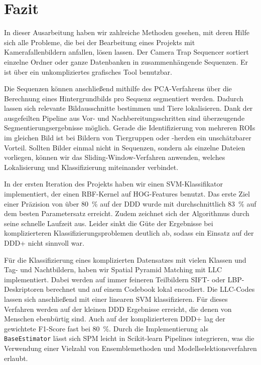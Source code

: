 \section{Fazit}
\label{sec:fazit}

In dieser Ausarbeitung haben wir zahlreiche Methoden gesehen, mit deren Hilfe sich alle Probleme, die bei der Bearbeitung eines Projekts mit Kamerafallenbildern anfallen, lösen lassen. Der Camera Trap Sequencer sortiert einzelne Ordner oder ganze Datenbanken in zusammenhängende Sequenzen. Er ist über ein unkompliziertes grafisches Tool benutzbar.

Die Sequenzen können anschließend mithilfe des PCA-Verfahrens über die Berechnung eines Hintergrundbilds pro Sequenz segmentiert werden. Dadurch lassen sich relevante Bildausschnitte bestimmen und Tiere lokalisieren. Dank der ausgefeilten Pipeline aus Vor- und Nachbereitungsschritten sind überzeugende Segmentierungsergebnisse möglich. Gerade die Identifizierung von mehreren ROIs im gleichen Bild ist bei Bildern von Tiergruppen oder -herden ein unschätzbarer Vorteil. Sollten Bilder einmal nicht in Sequenzen, sondern als einzelne Dateien vorliegen, können wir das Sliding-Window-Verfahren anwenden, welches Lokalisierung und Klassifizierung miteinander verbindet.

In der ersten Iteration des Projekts haben wir einen SVM-Klassifikator implementiert, der einen RBF-Kernel auf HOG-Features benutzt. Das erste Ziel einer Präzision von über 80~\% auf der DDD wurde mit durchschnittlich 83~\% auf dem besten Parametersatz erreicht. Zudem zeichnet sich der Algorithmus durch seine schnelle Laufzeit aus. Leider sinkt die Güte der Ergebnisse bei komplizierteren Klassifizierungsproblemen deutlich ab, sodass ein Einsatz auf der DDD+ nicht sinnvoll war.

Für die Klassifizierung eines komplizierten Datensatzes mit vielen Klassen und Tag- und Nachtbildern, haben wir Spatial Pyramid Matching mit LLC implementiert. Dabei werden auf immer feineren Teilbildern SIFT- oder LBP-Deskriptoren berechnet und auf einem Codebook lokal encodiert. Die LLC-Codes lassen sich anschließend mit einer linearen SVM klassifizieren. Für dieses Verfahren werden auf der kleinen DDD Ergebnisse erreicht, die denen von Menschen ebenbürtig sind. Auch auf der komplizierteren DDD+ lag der gewichtete F1-Score fast bei 80~\%. Durch die Implementierung als \texttt{BaseEstimator} lässt sich SPM leicht in Scikit-learn Pipelines integrieren, was die Verwendung einer Vielzahl von Ensemblemethoden und Modellselektionsverfahren erlaubt.

